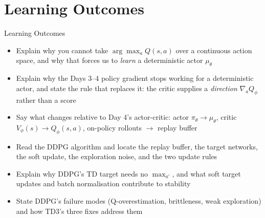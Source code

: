 \section{Learning Outcomes}
\begin{frame}{Learning Outcomes}
    \begin{itemize}
        \setlength{\itemsep}{0.7em}
        \item Explain why you cannot take $\arg\max_a Q(s,a)$ over a continuous action space, and why that forces us to \emph{learn} a deterministic actor $\mu_\theta$
        \item Explain why the Days 3--4 policy gradient stops working for a deterministic actor, and state the rule that replaces it: the critic supplies a \emph{direction} $\nabla_a Q_\phi$ rather than a score
        \item Say what changes relative to Day 4's actor-critic: actor $\pi_\theta \to \mu_\theta$, critic $V_\phi(s) \to Q_\phi(s,a)$, on-policy rollouts $\to$ replay buffer
        \item Read the DDPG algorithm and locate the replay buffer, the target networks, the soft update, the exploration noise, and the two update rules
        \item Explain why DDPG's TD target needs no $\max_{a'}$, and what soft target updates and batch normalisation contribute to stability
        \item State DDPG's failure modes (Q-overestimation, brittleness, weak exploration) and how TD3's three fixes address them
    \end{itemize}
\end{frame}
